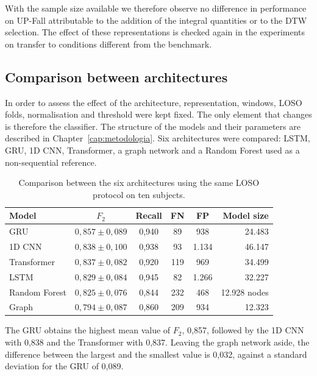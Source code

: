 With the sample size available we therefore observe no difference in performance on UP-Fall attributable to the addition of the integral quantities or to the DTW selection. The effect of these representations is checked again in the experiments on transfer to conditions different from the benchmark.

\subsection{Comparison between architectures}
\label{sec:architetture}

In order to assess the effect of the architecture, representation, windows, LOSO folds, normalisation and threshold were kept fixed.
The only element that changes is therefore the classifier. The structure of the models and their parameters are described in Chapter~\ref{cap:metodologia}.
Six architectures were compared: LSTM, GRU, 1D CNN,
Transformer, a graph network and a Random Forest used as a non-sequential reference.

\begin{table}[ht]
\centering
\caption{Comparison between the six architectures using the same
LOSO protocol on ten subjects.}
\label{tab:architetture}
\begin{tabular}{lccccr}
\toprule
\textbf{Model} &
\textbf{$F_2$} &
\textbf{Recall} &
\textbf{FN} &
\textbf{FP} &
\textbf{Model size} \\
\midrule
GRU & $0{,}857 \pm 0{,}089$ & 0,940 & 89 & 938 & 24.483 \\ 1D CNN & $0{,}838 \pm 0{,}100$ & 0,938 & 93 & 1.134 & 46.147 \\ Transformer & $0{,}837 \pm 0{,}082$ & 0,920 & 119 & 969 & 34.499 \\ LSTM & $0{,}829 \pm 0{,}084$ & 0,945 & 82 & 1.266 & 32.227 \\ Random Forest & $0{,}825 \pm 0{,}076$ & 0,844 & 232 & 468 & 12.928 nodes \\ Graph & $0{,}794 \pm 0{,}087$ & 0,860 & 209 & 934 & 12.323 \\
\bottomrule
\end{tabular}
\end{table}

The GRU obtains the highest mean value of $F_2$, 0,857, followed by the 1D CNN with 0,838 and the Transformer with 0,837. Leaving the graph network aside, the difference between the largest and the smallest value is 0,032, against a standard deviation for the GRU of 0,089.

